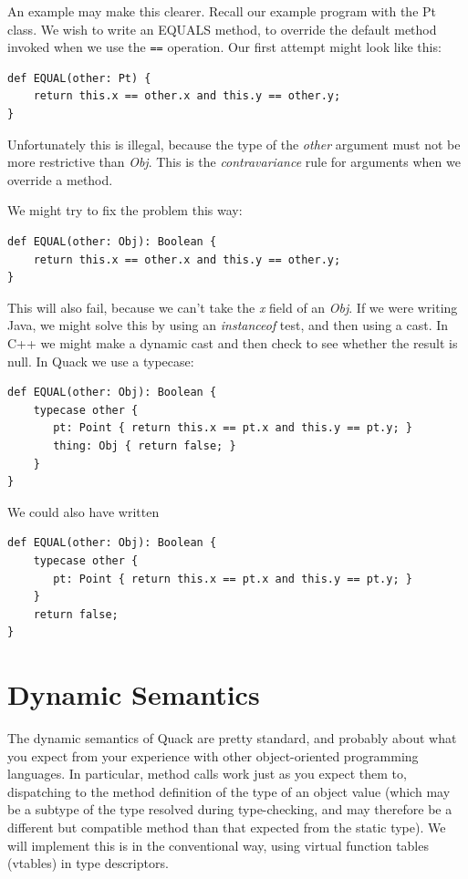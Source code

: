 \documentclass[11pt]{article}
\begin{document}
An example may make this clearer.  Recall our example program with the
Pt class.  We wish to write an EQUALS method, to override the default
method invoked when we use the \verb|==| operation.  Our first attempt 
might look like this: 

\begin{verbatim}
def EQUAL(other: Pt) {
    return this.x == other.x and this.y == other.y;
}
\end{verbatim}

Unfortunately this is illegal, because the type of the \emph{other}
argument must not be more restrictive than \emph{Obj}.  This is the 
\emph{contravariance} rule for arguments when we override a method. 

We might try to fix the problem this way: 

\begin{verbatim}
def EQUAL(other: Obj): Boolean {
    return this.x == other.x and this.y == other.y;
}
\end{verbatim}

This will also fail, because we can't take the \emph{x} field of an
\emph{Obj}.   If we were writing Java, we might solve this by using an
\emph{instanceof} test, and then using a cast.  In C++ we might make a
dynamic cast and then check to see whether the result is null.  In
Quack we use a typecase: 

\begin{verbatim}
def EQUAL(other: Obj): Boolean {
    typecase other {
       pt: Point { return this.x == pt.x and this.y == pt.y; }
       thing: Obj { return false; }
    }
}
\end{verbatim}

We could also have written

\begin{verbatim}
def EQUAL(other: Obj): Boolean {
    typecase other {
       pt: Point { return this.x == pt.x and this.y == pt.y; }
    }
    return false; 
}
\end{verbatim}



\section{Dynamic Semantics}

The dynamic semantics of Quack are pretty standard, and probably about
what you expect from your experience with  other object-oriented
programming languages.  In particular, method calls work just as you
expect them to, dispatching to the method definition of the type of an
object value (which may be a subtype of the type resolved during
type-checking, and may therefore be a different but compatible method
than that expected from the static type).  We will implement this is
in the conventional way, using virtual function tables (vtables) in
type descriptors.  
\end{document}
